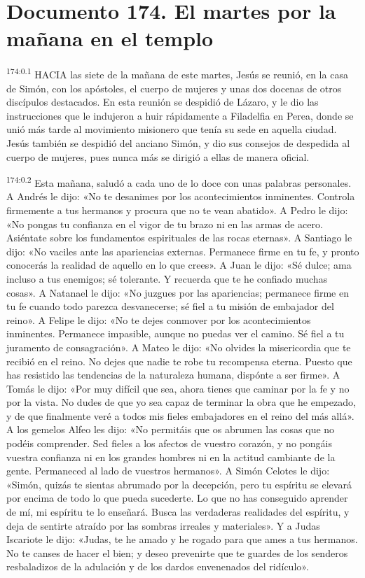 \chapter{Documento 174. El martes por la mañana en el templo}
\par 
\textsuperscript{174:0.1} HACIA las siete de la mañana de este martes, Jesús se reunió, en la casa de Simón, con los apóstoles, el cuerpo de mujeres y unas dos docenas de otros discípulos destacados. En esta reunión se despidió de Lázaro, y le dio las instrucciones que le indujeron a huir rápidamente a Filadelfia en Perea, donde se unió más tarde al movimiento misionero que tenía su sede en aquella ciudad. Jesús también se despidió del anciano Simón, y dio sus consejos de despedida al cuerpo de mujeres, pues nunca más se dirigió a ellas de manera oficial.

\par 
\textsuperscript{174:0.2} Esta mañana, saludó a cada uno de lo doce con unas palabras personales. A Andrés le dijo: «No te desanimes por los acontecimientos inminentes. Controla firmemente a tus hermanos y procura que no te vean abatido». A Pedro le dijo: «No pongas tu confianza en el vigor de tu brazo ni en las armas de acero. Asiéntate sobre los fundamentos espirituales de las rocas eternas». A Santiago le dijo: «No vaciles ante las apariencias externas. Permanece firme en tu fe, y pronto conocerás la realidad de aquello en lo que crees». A Juan le dijo: «Sé dulce; ama incluso a tus enemigos; sé tolerante. Y recuerda que te he confiado muchas cosas». A Natanael le dijo: «No juzgues por las apariencias; permanece firme en tu fe cuando todo parezca desvanecerse; sé fiel a tu misión de embajador del reino». A Felipe le dijo: «No te dejes conmover por los acontecimientos inminentes. Permanece impasible, aunque no puedas ver el camino. Sé fiel a tu juramento de consagración». A Mateo le dijo: «No olvides la misericordia que te recibió en el reino. No dejes que nadie te robe tu recompensa eterna. Puesto que has resistido las tendencias de la naturaleza humana, dispónte a ser firme». A Tomás le dijo: «Por muy difícil que sea, ahora tienes que caminar por la fe y no por la vista. No dudes de que yo sea capaz de terminar la obra que he empezado, y de que finalmente veré a todos mis fieles embajadores en el reino del más allá». A los gemelos Alfeo les dijo: «No permitáis que os abrumen las cosas que no podéis comprender. Sed fieles a los afectos de vuestro corazón, y no pongáis vuestra confianza ni en los grandes hombres ni en la actitud cambiante de la gente. Permaneced al lado de vuestros hermanos». A Simón Celotes le dijo: «Simón, quizás te sientas abrumado por la decepción, pero tu espíritu se elevará por encima de todo lo que pueda sucederte. Lo que no has conseguido aprender de mí, mi espíritu te lo enseñará. Busca las verdaderas realidades del espíritu, y deja de sentirte atraído por las sombras irreales y materiales». Y a Judas Iscariote le dijo: «Judas, te he amado y he rogado para que ames a tus hermanos. No te canses de hacer el bien; y deseo prevenirte que te guardes de los senderos resbaladizos de la adulación y de los dardos envenenados del ridículo».

